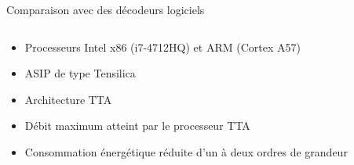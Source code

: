 \begin{frame}[c]{Comparaison avec des décodeurs logiciels}
  \begin{columns}[T] %
  \begin{column}{.48\textwidth}
    \begin{itemize}
      \vfill
      \item<+-> Processeurs Intel x86 (i7-4712HQ) et ARM (Cortex A57)
      \vfill
      \item<+-> ASIP de type Tensilica
      \vfill
      \item<+-> Architecture TTA
      \vfill
      \item<+-> Débit maximum atteint par le processeur TTA
      \vfill
      \item<+-> Consommation énergétique réduite d'un à deux ordres de grandeur
      \vfill
    \end{itemize}
  \end{column}

  \begin{column}{.48\textwidth}
\end{column}
\end{columns}
\end{frame}
